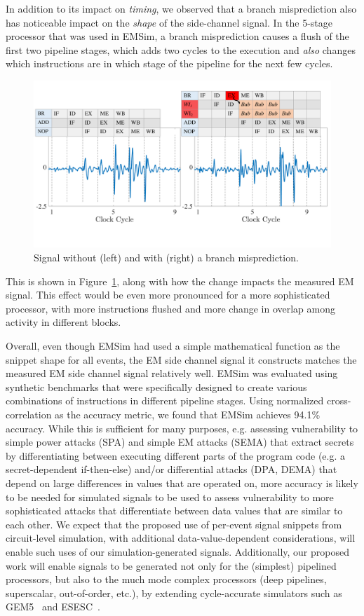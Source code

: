 In addition to its impact on \emph{timing}, we observed that a branch misprediction also has noticeable impact on the \emph{shape} of the side-channel signal. In the 5-stage processor that was used in EMSim, a branch misprediction causes a flush of the first two pipeline stages, which adds two cycles to the execution and \emph{also} changes which instructions are in which stage of the pipeline for the next few cycles.
\begin{figure}
	\includegraphics[width=0.5\columnwidth,clip]{figure/mise2.pdf}
\vspace{-0.3in}
	\caption{Signal without (left) and with (right) a branch misprediction.}
	\label{fig:mis}
   \vspace{-0.1in}
\end{figure}
 This is shown in Figure~\ref{fig:mis}, along with how the change impacts the measured EM signal.
This effect would be even more pronounced for a more sophisticated processor, with more instructions flushed and more change in overlap among activity in different blocks.

Overall, even though EMSim had used a simple mathematical function as the snippet shape for all events, the EM side channel signal it constructs matches the measured EM side channel signal relatively well. EMSim was evaluated using synthetic benchmarks that were specifically designed to create various combinations of instructions in different pipeline stages. Using normalized cross-correlation as the accuracy metric, we found that EMSim achieves 94.1\% accuracy. While this is sufficient for many purposes, e.g. assessing vulnerability to simple power attacks (SPA) and simple EM attacks (SEMA) that extract secrets by differentiating between executing different parts of the program code (e.g. a secret-dependent if-then-else) and/or differential attacks (DPA, DEMA) that depend on large differences in values that are operated on, more accuracy is likely to be needed for simulated signals to be used to assess vulnerability to more sophisticated attacks that differentiate between data values that are similar to each other. We expect that the proposed use of per-event signal snippets from circuit-level simulation, with additional data-value-dependent considerations, will enable such uses of our simulation-generated signals. Additionally, our proposed work will enable signals to be generated not only for the (simplest) pipelined processors, but also to the much mode complex processors (deep pipelines, superscalar, out-of-order, etc.), by extending cycle-accurate simulators such as GEM5~\cite{gem5} and ESESC~\cite{esesc}.

